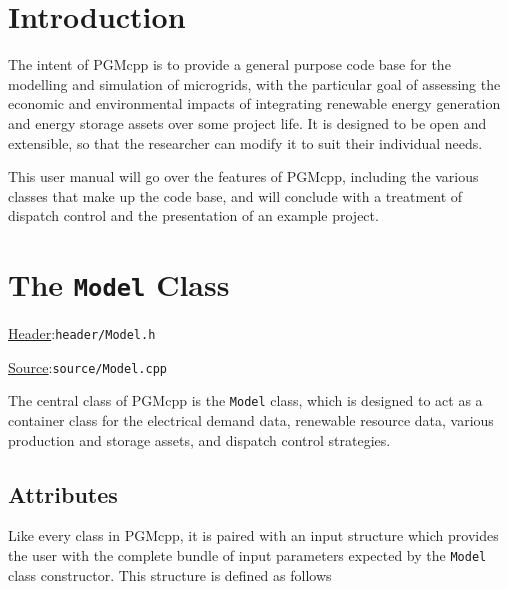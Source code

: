 \documentclass[12pt, letterpaper]{report}
\begin{document}
\tableofcontents
{}

\listoftables
{}


\newpage 
{}
\chapter{Introduction}

The intent of PGMcpp is to provide a general purpose code base for the modelling and simulation of microgrids, with the particular goal of assessing the economic and environmental impacts of integrating renewable energy generation and energy storage assets over some project life. It is designed to be open and extensible, so that the researcher can modify it to suit their individual needs.\par 
This user manual will go over the features of PGMcpp, including the various classes that make up the code base, and will conclude with a treatment of dispatch control and the presentation of an example project.

\chapter{The \texttt{Model} Class}


\begin{large}
\noindent\underline{Header}:\quad\texttt{header/Model.h}\par
\noindent\underline{Source}:\quad\texttt{source/Model.cpp}\par
\end{large}
\vspace{5mm}

The central class of PGMcpp is the \texttt{Model} class, which is designed to act as a container class for the electrical demand data, renewable resource data, various production and storage assets, and dispatch control strategies.

\section{Attributes}

Like every class in PGMcpp, it is paired with an input structure which provides the user with the complete bundle of input parameters expected by the \texttt{Model} class constructor. This structure is defined as follows
\end{document}
